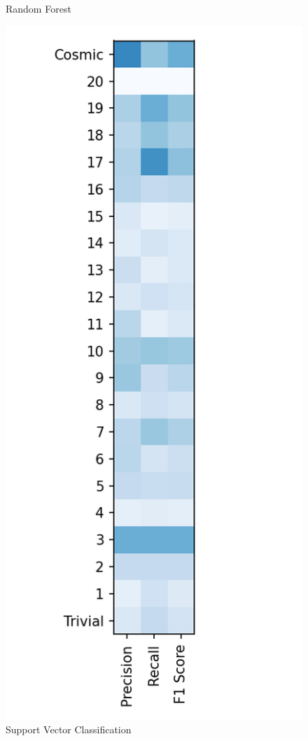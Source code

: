 \documentclass{article}
\begin{document}
\begin{figure}[ht]
\begin{minipage}[b]{0.32\linewidth}
			\caption*{Random Forest} 
			\vspace{10ex}
		\end{minipage} \hfill
		\begin{minipage}[b]{0.32\linewidth}
			\centering
			\includegraphics[width=\linewidth]{22 - Support Vector Classification.png} 
			\caption*{Support Vector Classification} 
			\vspace{10ex}
		\end{minipage}
	\end{figure}
\end{document}
